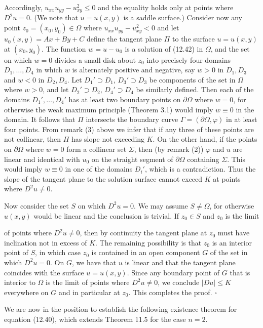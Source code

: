 Accordingly, $u_{xx}u_{yy}-u_{xy}^2\le 0$ and the equality holds only at points where $D^2u=0$.
(We note that $u=u(x,y)$ is a saddle surface.) Consider now any point $z_0=
(x_0,y_0)\in \Omega$ where $u_{xx}u_{yy}-u_{xy}^2<0$ and let $u_0(x,y)=Ax+By+C$ define the tangent
plane $\Pi$ to the surface $u=u(x,y)$ at $(x_0,y_0)$. The function $w=u-u_0$ is a solution
of (12.42) in $\Omega$, and the set on which $w=0$ divides a small disk about $z_0$ into
precisely four domains $D_1,\dots,D_4$ in which $w$ is alternately positive and negative,
say $w>0$ in $D_1,D_3$ and $w<0$ in $D_2,D_4$. Let $D_1'\supset D_1$, $D_3'\supset D_3$ be components of
the set in $\Omega$ where $w>0$, and let $D_2'\supset D_2$, $D_4'\supset D_4$ be similarly defined. Then
each of the domains $D_1',\dots,D_4'$ has at least two boundary points on $\partial\Omega$ where
$w=0$, for otherwise the weak maximum principle (Theorem 3.1) would imply $w\equiv 0$
in the domain. It follows that $\Pi$ intersects the boundary curve $\Gamma=(\partial\Omega,\varphi)$ in at
least four points. From remark (3) above we infer that if any three of these points
are not collinear, then $\Pi$ has slope not exceeding $K$. On the other hand, if the points
on $\partial\Omega$ where $w=0$ form a collinear set $\Sigma$, then (by remark (2)) $\varphi$ and $u$ are linear
and identical with $u_0$ on the straight segment of $\partial\Omega$ containing $\Sigma$. This would imply
$w\equiv 0$ in one of the domains $D_i'$, which is a contradiction. Thus the slope of the
tangent plane to the solution surface cannot exceed $K$ at points where $D^2u\neq 0$.

Now consider the set $S$ on which $D^2u=0$. We may assume $S\neq \Omega$, for otherwise
$u(x,y)$ would be linear and the conclusion is trivial. If $z_0\in S$ and $z_0$ is the limit



of points where $D^2u\neq 0$, then by continuity the tangent plane at $z_0$ must have
inclination not in excess of $K$. The remaining possibility is that $z_0$ is an interior
point of $S$, in which case $z_0$ is contained in an open component $G$ of the set in
which $D^2u=0$. On $G$, we have that $u$ is linear and that the tangent plane coincides
with the surface $u=u(x,y)$. Since any boundary point of $G$ that is interior to $\Omega$ is
the limit of points where $D^2u\neq 0$, we conclude $|Du|\le K$ everywhere on $G$ and in
particular at $z_0$. This completes the proof. $\square$

We are now in the position to establish the following existence theorem for
equation (12.40), which extends Theorem 11.5 for the case $n=2$.

